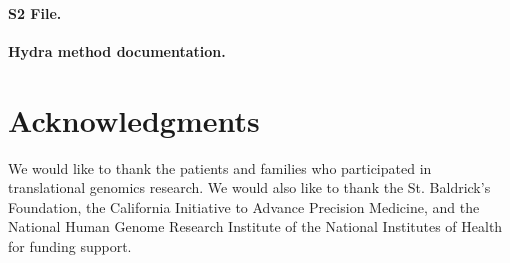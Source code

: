 \documentclass[10pt,letterpaper]{article}
\begin{document}
\paragraph*{S2 File.}
\label{S2_File}
{\bf Hydra method documentation.}




\section*{Acknowledgments}
We would like to thank the patients and families who participated in translational genomics research. We would also like to thank the St. Baldrick's Foundation, the California Initiative to Advance Precision Medicine, and the National Human Genome Research Institute of the National Institutes of Health for funding support.

\nolinenumbers

%
%
%
\end{document}
